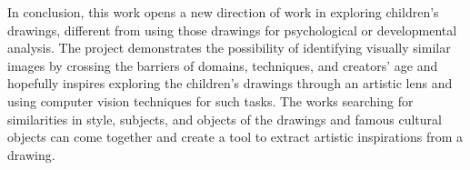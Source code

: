 In conclusion, this work opens a new direction of work in exploring children's drawings, different from using those drawings for psychological or developmental analysis. The project demonstrates the possibility of identifying visually similar images by crossing the barriers of domains, techniques, and creators' age and hopefully inspires exploring the children's drawings through an artistic lens and using computer vision techniques for such tasks. The works searching for similarities in style, subjects, and objects of the drawings and famous cultural objects can come together and create a tool to extract artistic inspirations from a drawing.